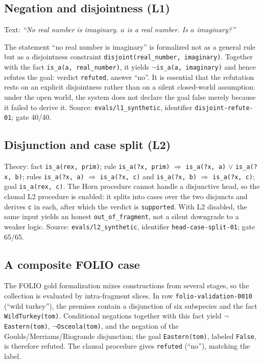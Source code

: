 \documentclass[11pt,a4paper]{article}
\begin{document}
\subsection{Negation and disjointness (L1)}

Text: \emph{``No real number is imaginary. $a$ is a real number. Is $a$ imaginary?''}

The statement ``no real number is imaginary'' is formalized not as a general rule but as a
disjointness constraint \texttt{disjoint(real\_number, imaginary)}. Together with the fact
\texttt{is\_a(a, real\_number)}, it yields \texttt{$\neg$is\_a(a, imaginary)} and hence
refutes the goal: verdict \texttt{refuted}, answer ``no''. It is essential that the
refutation rests on an explicit disjointness rather than on a silent closed-world
assumption: under the open world, the system does not declare the goal false merely because
it failed to derive it. Source: \texttt{evals/l1\_synthetic}, identifier
\texttt{disjoint-refute-01}; gate 40/40.

\subsection{Disjunction and case split (L2)}

Theory: fact \texttt{is\_a(rex, prim)}; rule \texttt{is\_a(?x, prim)} $\Rightarrow$
\texttt{is\_a(?x, a)} $\lor$ \texttt{is\_a(?x, b)}; rules \texttt{is\_a(?x, a)}
$\Rightarrow$ \texttt{is\_a(?x, c)} and \texttt{is\_a(?x, b)} $\Rightarrow$
\texttt{is\_a(?x, c)}; goal \texttt{is\_a(rex, c)}. The Horn procedure cannot handle a
disjunctive head, so the clausal L2 procedure is enabled: it splits into cases over the two
disjuncts and derives \texttt{c} in each, after which the verdict is \texttt{supported}.
With L2 disabled, the same input yields an honest \texttt{out\_of\_fragment}, not a silent
downgrade to a weaker logic. Source: \texttt{evals/l2\_synthetic}, identifier
\texttt{head-case-split-01}; gate 65/65.

\subsection{A composite FOLIO case}

The FOLIO gold formalization mixes constructions from several stages, so the collection is
evaluated by intra-fragment slices. In row \texttt{folio-validation-0010} (``wild turkey''),
the premises contain a disjunction of six subspecies and the fact \texttt{WildTurkey(tom)}.
Conditional negations together with this fact yield \texttt{$\neg$Eastern(tom)},
\texttt{$\neg$Osceola(tom)}, and the negation of the Goulds/Merriams/Riogrande disjunction;
the goal \texttt{Eastern(tom)}, labeled \texttt{False}, is therefore refuted. The clausal
procedure gives \texttt{refuted} (``no''), matching the label.
\end{document}
